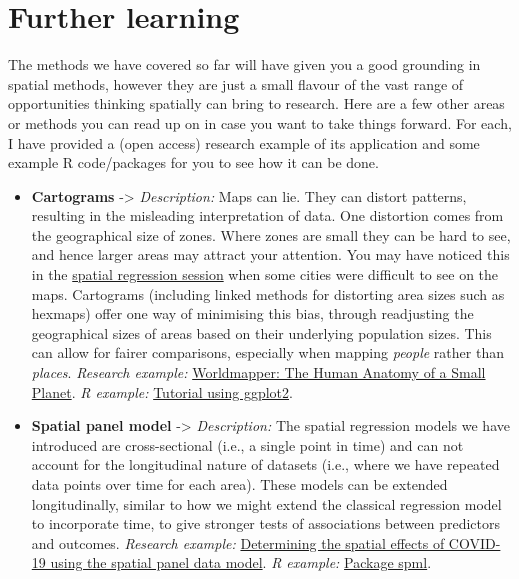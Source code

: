 \documentclass[
]{book}
\providecommand{\tightlist}{%
  \setlength{\itemsep}{0pt}\setlength{\parskip}{0pt}}
\begin{document}
\hypertarget{further-learning}{%
\section{Further learning}\label{further-learning}}

The methods we have covered so far will have given you a good grounding in spatial methods, however they are just a small flavour of the vast range of opportunities thinking spatially can bring to research. Here are a few other areas or methods you can read up on in case you want to take things forward. For each, I have provided a (open access) research example of its application and some example R code/packages for you to see how it can be done.

\begin{itemize}
\tightlist
\item
  \textbf{Cartograms} -\textgreater{} \emph{Description:} Maps can lie. They can distort patterns, resulting in the misleading interpretation of data. One distortion comes from the geographical size of zones. Where zones are small they can be hard to see, and hence larger areas may attract your attention. You may have noticed this in the \protect\hyperlink{spatreg}{spatial regression session} when some cities were difficult to see on the maps. Cartograms (including linked methods for distorting area sizes such as hexmaps) offer one way of minimising this bias, through readjusting the geographical sizes of areas based on their underlying population sizes. This can allow for fairer comparisons, especially when mapping \emph{people} rather than \emph{places}. \emph{Research example:} \href{https://journals.plos.org/plosmedicine/article?id=10.1371/journal.pmed.0040001}{Worldmapper: The Human Anatomy of a Small Planet}. \emph{R example:} \href{https://r-charts.com/spatial/cartogram-ggplot2/}{Tutorial using ggplot2}.
\item
  \textbf{Spatial panel model} -\textgreater{} \emph{Description:} The spatial regression models we have introduced are cross-sectional (i.e., a single point in time) and can not account for the longitudinal nature of datasets (i.e., where we have repeated data points over time for each area). These models can be extended longitudinally, similar to how we might extend the classical regression model to incorporate time, to give stronger tests of associations between predictors and outcomes. \emph{Research example:} \href{https://www.ncbi.nlm.nih.gov/pmc/articles/PMC7139267/}{Determining the spatial effects of COVID-19 using the spatial panel data model}. \emph{R example:} \href{http://www.jstatsoft.org/v47/i01/}{Package spml}.

\end{itemize}
\end{document}
